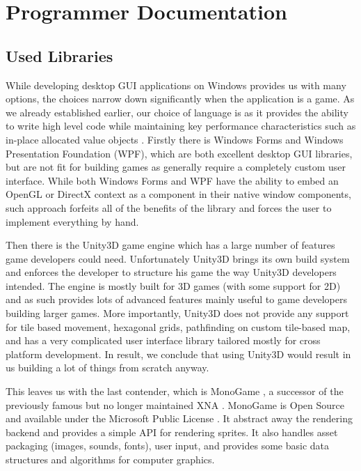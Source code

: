 \chapter{Programmer Documentation}
\label{chap:prog-doc}

\section{Used Libraries}
\label{sec:libraries}

While developing desktop GUI applications on Windows provides us with many options, the choices narrow down significantly when the application is a game. As we already established earlier, our choice of language is \Csh{} as it provides the ability to write high level code while maintaining key performance characteristics such as in-place allocated value objects \citep{highperf-dotnet}. Firstly there is Windows Forms \citep{winforms} and Windows Presentation Foundation \citep{wpf} (WPF), which are both excellent desktop GUI libraries, but are not fit for building games as generally require a completely custom user interface. While both Windows Forms and WPF have the ability to embed an OpenGL or DirectX context as a component in their native window components, such approach forfeits all of the benefits of the library and forces the user to implement everything by hand.

Then there is the Unity3D game engine \citep{unity3d} which has a large number of features game developers could need. Unfortunately Unity3D brings its own build system and enforces the developer to structure his game the way Unity3D developers intended. The engine is mostly built for 3D games (with some support for 2D) and as such provides lots of advanced features mainly useful to game developers building larger games. More importantly, Unity3D does not provide any support for tile based movement, hexagonal grids, pathfinding on custom tile-based map, and has a very complicated user interface library tailored mostly for cross platform development. In result, we conclude that using Unity3D would result in us building a lot of things from scratch anyway.

This leaves us with the last contender, which is MonoGame \citep{monogame}, a successor of the previously famous but no longer maintained XNA \citep{xna}. MonoGame is Open Source and available under the Microsoft Public License \citep{ms-pl}. It abstract away the rendering backend and provides a simple API for rendering sprites. It also handles asset packaging (images, sounds, fonts), user input, and provides some basic data structures and algorithms for computer graphics.

